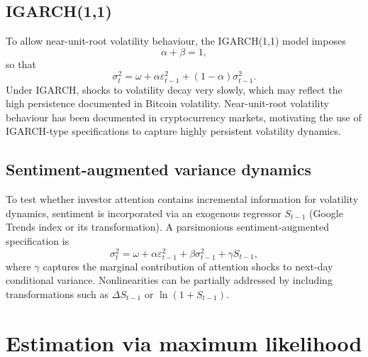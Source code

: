 \documentclass[12pt]{report}
\begin{document}
\subsection{IGARCH(1,1)}

To allow near-unit-root volatility behaviour, the IGARCH(1,1) model imposes
\begin{equation}
\alpha+\beta = 1,
\end{equation}
so that
\begin{equation}
\sigma_t^2 = \omega + \alpha \varepsilon_{t-1}^2 + (1-\alpha)\sigma_{t-1}^2.
\end{equation}
Under IGARCH, shocks to volatility decay very slowly, which may reflect the high persistence documented in Bitcoin volatility. Near-unit-root volatility behaviour has been documented in cryptocurrency markets, motivating the use of IGARCH-type specifications to capture highly persistent volatility dynamics. %
\subsection{Sentiment-augmented variance dynamics}

To test whether investor attention contains incremental information for volatility dynamics, sentiment is incorporated via an exogenous regressor $S_{t-1}$ (Google Trends index or its transformation). A parsimonious sentiment-augmented specification is
\begin{equation}
\sigma_t^2 = \omega + \alpha \varepsilon_{t-1}^2 + \beta \sigma_{t-1}^2 + \gamma S_{t-1},
\end{equation}
where $\gamma$ captures the marginal contribution of attention shocks to next-day conditional variance. Nonlinearities can be partially addressed by including transformations such as $\Delta S_{t-1}$ or $\ln(1+S_{t-1})$.


\section{Estimation via maximum likelihood}
\end{document}
